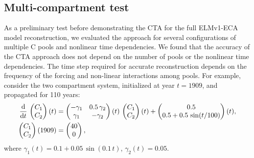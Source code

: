 \documentclass[11pt,a4paper]{article}
\newcommand{\deriv}[1]{\frac{\mathrm{d}}{\mathrm{d}#1}}
\begin{document}
\subsection{Multi-compartment test}
    As a preliminary test before demonstrating the CTA for the full ELMv1-ECA model reconstruction, we evaluated the approach for several configurations of multiple C pools and nonlinear time dependencies. We found that the accuracy of the CTA approach does not depend on the number of pools or the nonlinear time dependencies. The time step required for accurate reconstruction depends on the frequency of the forcing and non-linear interactions among pools. For example, consider the two compartment system, initialized at year $t=1909$, and propagated for 110 years:
    \begin{equation}\label{eqn:CS_two_dim_example}
        \begingroup\makeatletter\def\f@size{10}\check@mathfonts
        \begin{aligned}
            \deriv{t}\,\begin{pmatrix} C_1 \\ C_2 \end{pmatrix}(t) &= 
            \begin{pmatrix} -\gamma_1 & 0.5\,\gamma_2 \\ \gamma_1 & -\gamma_2 \end{pmatrix}(t)\,
            \begin{pmatrix} C_1 \\ C_2 \end{pmatrix}(t) +  
            \begin{pmatrix} 0.5 \\ 0.5 + 0.5\,\sin(t/100) \end{pmatrix}(t),\\
            \begin{pmatrix} C_1 \\ C_2 \end{pmatrix}(1909) &=
            \begin{pmatrix} 40 \\ 0 \end{pmatrix},
        \end{aligned}
        \endgroup
    \end{equation}
    where $\gamma_1(t)=0.1+0.05\,\sin(0.1\,t)$, $\gamma_2(t)=0.05$.
    
\end{document}
